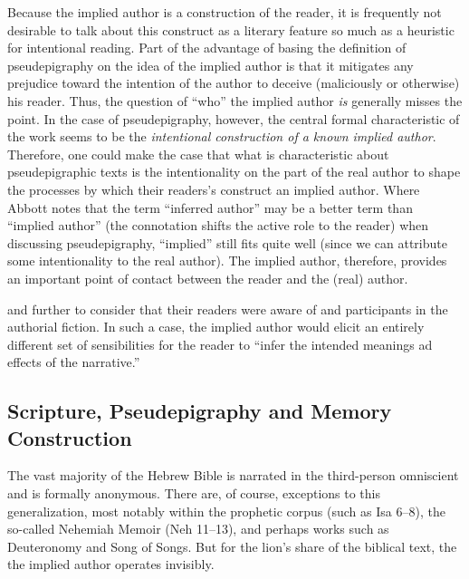 Because the implied author is a construction of the reader, it is
frequently not desirable to talk about this construct as a literary
feature so much as a heuristic for intentional reading. Part of the
advantage of basing the definition of pseudepigraphy on the idea of the
implied author is that it mitigates any prejudice toward the intention
of the author to deceive (maliciously or otherwise) his reader. Thus,
the question of ``who'' the implied author \emph{is} generally misses
the point. In the case of pseudepigraphy, however, the central formal
characteristic of the work seems to be the \emph{intentional
construction of a known implied author}. Therefore, one could make the
case that what is characteristic about pseudepigraphic texts is the
intentionality on the part of the real author to shape the processes by
which their readers's construct an implied author. Where Abbott notes
that the term ``inferred author'' may be a better term than ``implied
author'' (the connotation shifts the active role to the reader) when
discussing pseudepigraphy, ``implied'' still fits quite well (since we
can attribute some intentionality to the real author). The implied
author, therefore, provides an important point of contact between the
reader and the (real) author.

and further to consider that their readers were aware of and
participants in the authorial fiction. In such a case, the implied
author would elicit an entirely different set of sensibilities for the
reader to ``infer the intended meanings ad effects of the
narrative.''\autocite[235]{abbott2008}

\hypertarget{scripture-psy-and-memory-construction}{%
\subsection{Scripture, Pseudepigraphy and Memory
Construction}\label{scripture-psy-and-memory-construction}}

The vast majority of the Hebrew Bible is narrated in the third-person
omniscient and is formally anonymous. There are, of course, exceptions
to this generalization, most notably within the prophetic corpus (such
as Isa 6--8), the so-called Nehemiah Memoir (Neh 11--13), and perhaps
works such as Deuteronomy and Song of Songs. But for the lion's share of
the biblical text, the the implied author operates invisibly.

